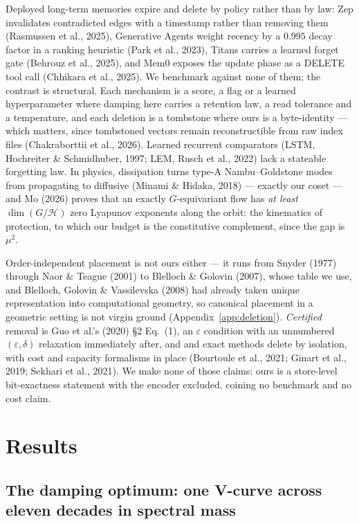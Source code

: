 \documentclass{article}
\begin{document}
{\small Deployed long-term memories expire and delete by policy rather than by law: Zep invalidates contradicted edges with a timestamp rather than removing them (Rasmussen et al., 2025), Generative Agents weight recency by a $0.995$ decay factor in a ranking heuristic (Park et al., 2023), Titans carries a learned forget gate (Behrouz et al., 2025), and Mem0 exposes the update phase as a DELETE tool call (Chhikara et al., 2025). We benchmark against none of them; the contrast is structural. Each mechanism is a score, a flag or a learned hyperparameter where damping here carries a retention law, a read tolerance and a temperature, and each deletion is a tombstone where ours is a byte-identity --- which matters, since tombstoned vectors remain reconstructible from raw index files (Chakraborttii et al., 2026). Learned recurrent comparators (LSTM, Hochreiter \& Schmidhuber, 1997; LEM, Rusch et al., 2022) lack a stateable forgetting law. In physics, dissipation turns type-A Nambu--Goldstone modes from propagating to diffusive (Minami \& Hidaka, 2018) --- exactly our coset --- and Mo (2026) proves that an exactly $G$-equivariant flow has \emph{at least} $\dim(G/\mathcal H)$ zero Lyapunov exponents along the orbit: the kinematics of protection, to which our budget is the constitutive complement, since the gap is $\mu^2$.

Order-independent placement is not ours either --- it runs from Snyder (1977) through Naor \& Teague (2001) to Blelloch \& Golovin (2007), whose table we use, and Blelloch, Golovin \& Vassilevska (2008) had already taken unique representation into computational geometry, so canonical placement in a geometric setting is not virgin ground (Appendix~\ref{app:deletion}). \emph{Certified} removal is Guo et al.'s (2020) \S2 Eq.~(1), an $\varepsilon$ condition with an unnumbered $(\varepsilon,\delta)$ relaxation immediately after, and and exact methods delete by isolation, with cost and capacity formalisms in place (Bourtoule et al., 2021; Ginart et al., 2019; Sekhari et al., 2021). We make none of those claims: ours is a store-level bit-exactness statement with the encoder excluded, coining no benchmark and no cost claim.\par}
\section{Results}\label{sec:results}

\subsection{The damping optimum: one V-curve across eleven decades in spectral mass}\label{sec:vcurve}
\end{document}
